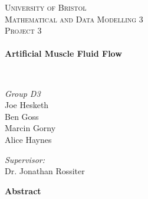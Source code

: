 
\begin{titlepage}
\begin{center}


\textsc{\Huge University of Bristol}\\[1.5cm]


\textsc{\Large Mathematical and Data Modelling 3}\\[0.5cm]

\textsc{\large Project 3}\\[0.5cm]

\HRule \\[0.4cm]
{ \huge \bfseries Artificial Muscle Fluid Flow \\[0.4cm] }

\HRule \\[1.5cm]

\begin{minipage}{0.4\textwidth}
\begin{flushleft} \large
\emph{Group D3}\\
Joe Hesketh\\
Ben Goss\\
Marcin Gorny\\
Alice Haynes\\
\end{flushleft}
\end{minipage}
\begin{minipage}{0.4\textwidth}
\begin{flushright} \large
\emph{Supervisor:} \\
Dr. Jonathan Rossiter
\end{flushright}
\end{minipage}
\end{center}

\vspace{1cm}
\center
\begin{minipage}{0.9\textwidth}

\textbf{Abstract}


\end{minipage}
\end{titlepage}
